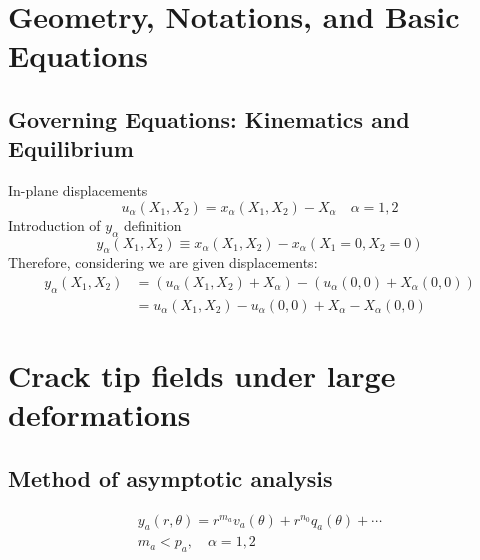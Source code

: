 \documentclass[12pt,3p]{article}
\numberwithin{equation}{section}
\begin{document}
\section{Geometry, Notations, and Basic Equations}

\subsection{Governing Equations: Kinematics and Equilibrium}
In-plane displacements
\begin{equation}
u_{\alpha}\left(X_{1}, X_{2}\right)=x_{\alpha}\left(X_{1}, X_{2}\right)-X_{\alpha} \quad \alpha=1,2
\end{equation}
Introduction of $y_\alpha$ definition
\begin{equation}
y_{\alpha}\left(X_{1}, X_{2}\right) \equiv x_{\alpha}\left(X_{1}, X_{2}\right)-x_{\alpha}\left(X_{1}=0, X_{2}=0\right)
\end{equation}
Therefore, considering we are given displacements: 
\begin{align}
y_{\alpha}\left(X_{1}, X_{2}\right) &=  (u_{\alpha}\left(X_{1}, X_{2}\right) +X_{\alpha}) - (u_{\alpha}\left(0, 0 \right) +X_{\alpha} (0, 0)) \\
&= u_{\alpha}\left(X_{1}, X_{2}\right) - u_{\alpha} (0, 0) + X_{\alpha} - X_{\alpha} (0,0)
\end{align}

\section{Crack tip fields under large deformations}

\subsection{Method of asymptotic analysis}
\begin{equation}
\begin{array}{l}
y_{a}(r, \theta)=r^{m_{a}} v_{a}(\theta)+r^{n_{0}} q_{a}(\theta)+\cdots \\
m_{a}<p_{a}, \quad \alpha=1,2
\end{array}
\end{equation}
\end{document}
